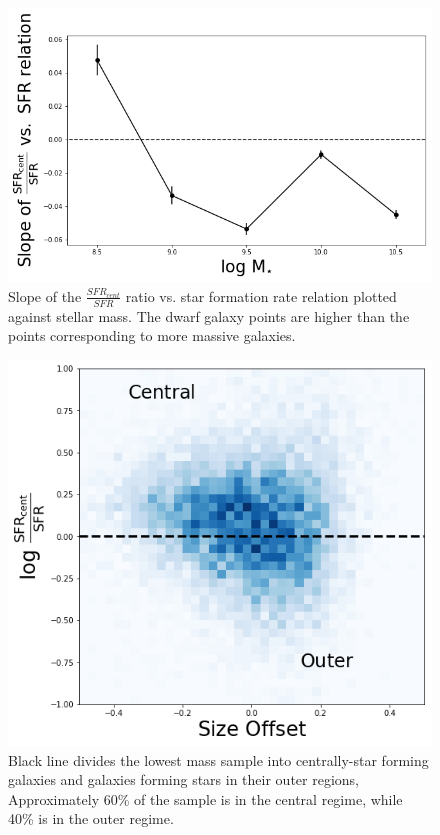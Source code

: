 \documentclass[iop]{emulateapj}
\begin{document}
\begin{figure}
	\centering
	\includegraphics[width= \columnwidth]{cent_sfr_slopes.png}
	\caption{Slope of the $\frac{SFR_{cent}}{SFR}$ ratio vs. star formation rate relation plotted against stellar mass.  The dwarf galaxy points are higher than the points corresponding to more massive galaxies.}
	\label{fig:dens_slope}
	
\end{figure}



\begin{figure}
	\centering
	\includegraphics[width=1. \columnwidth]{GMM.png}
	\caption{Black line divides the lowest mass sample into centrally-star forming galaxies and galaxies forming stars in their outer regions, Approximately 60\% of the sample is in the central regime, while 40\% is in the outer regime.}
	\label{fig:HA_duty}
	
\end{figure}
\end{document}
